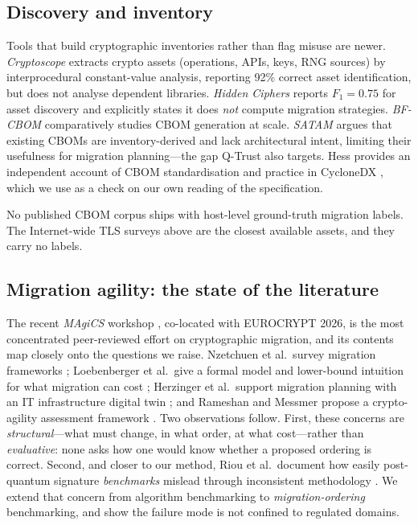 \documentclass[conference]{IEEEtran}
\begin{document}
\subsection{Discovery and inventory}

Tools that build cryptographic inventories rather than flag misuse are newer.
\emph{Cryptoscope} \cite{cryptoscope} extracts crypto assets (operations, APIs, keys,
RNG sources) by interprocedural constant-value analysis, reporting 92\% correct asset
identification, but does not analyse dependent libraries. \emph{Hidden Ciphers}
\cite{hiddenciphers} reports $F_1=0.75$ for asset discovery and explicitly states it does
\emph{not} compute migration strategies. \emph{BF-CBOM} \cite{bfcbom} comparatively
studies CBOM generation at scale. \emph{SATAM} \cite{satam} argues that existing CBOMs
are inventory-derived and lack architectural intent, limiting their usefulness for
migration planning---the gap Q-Trust also targets. Hess provides an independent account of
CBOM standardisation and practice in CycloneDX \cite{hess2026}, which we use as a check on
our own reading of the specification.

No published CBOM corpus ships with host-level ground-truth migration labels. The
Internet-wide TLS surveys above are the closest available assets, and they carry no labels.

\subsection{Migration agility: the state of the literature}

The recent \emph{MAgiCS} workshop \cite{magics2026}, co-located with EUROCRYPT 2026, is the
most concentrated peer-reviewed effort on cryptographic migration, and its contents map
closely onto the questions we raise. Nzetchuen et al.\ survey migration frameworks
\cite{nzetchuen2026}; Loebenberger et al.\ give a formal model and lower-bound intuition
for what migration can cost \cite{loebenberger2026}; Herzinger et al.\ support migration
planning with an IT infrastructure digital twin \cite{herzinger2026}; and Rameshan and
Messmer propose a crypto-agility assessment framework \cite{rameshan2026}. Two observations
follow. First, these concerns are \emph{structural}---what must change, in what order, at
what cost---rather than \emph{evaluative}: none asks how one would know whether a proposed
ordering is correct. Second, and closer to our method, Riou et al.\ document how easily
post-quantum signature \emph{benchmarks} mislead through inconsistent methodology
\cite{riou2026}. We extend that concern from algorithm benchmarking to
\emph{migration-ordering} benchmarking, and show the failure mode is not confined to
regulated domains.
\end{document}

